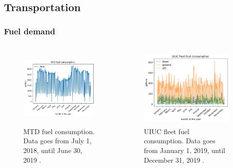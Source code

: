 \subsection{Transportation}
\begin{frame}
\frametitle{Fuel demand}
\begin{columns}
    \column[t]{5cm}
	\begin{figure}[htbp!]
		\begin{center}
			\includegraphics[height=4cm]{images/mtd2}
		\end{center}
		\caption{MTD fuel consumption. Data goes from July 1, 2018, until June 30, 2019 \cite{mtd_irecords_2019}.}
	\end{figure}

	\column[t]{5cm}
	\begin{figure}[htbp!]
		\begin{center}
			\includegraphics[height=4cm]{images/uiuc}
		\end{center}
		\caption{UIUC fleet fuel consumption. Data goes from January 1, 2019, until December 31, 2019 \cite{uiuc_personnal_communication}.}
	\end{figure}
\end{columns}
\end{frame}



